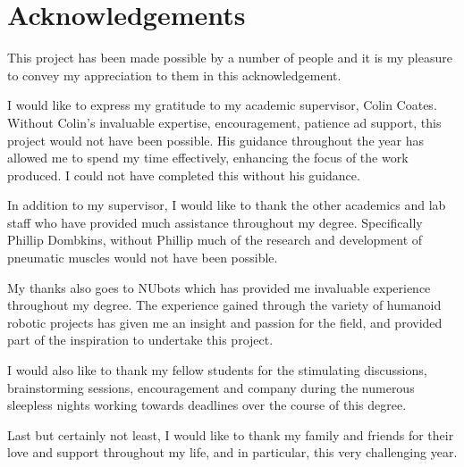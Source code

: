 \section*{Acknowledgements}
\raggedright\hfill\break

This project has been made possible by a number of people and it is my pleasure to convey my appreciation to them in this acknowledgement.\newline

I would like to express my gratitude to my academic supervisor, Colin Coates. Without Colin's invaluable expertise, encouragement, patience ad support, this project would not have been possible. His guidance throughout the year has allowed me to spend my time effectively, enhancing the focus of the work produced. I could not have completed this without his guidance.\newline

In addition to my supervisor, I would like to thank the other academics and lab staff who have provided much assistance throughout my degree. Specifically Phillip Dombkins, without Phillip much of the research and development of pneumatic muscles would not have been possible.\newline

My thanks also goes to NUbots which has provided me invaluable experience
throughout my degree. The experience gained through the variety of humanoid robotic projects has given me an insight and passion for the field, and provided part of the inspiration to undertake this project.\newline

I would also like to thank my fellow students for the stimulating discussions, brainstorming
sessions, encouragement and company during the numerous sleepless nights working towards
deadlines over the course of this degree.\newline

Last but certainly not least, I would like to thank my family and friends for their love and
support throughout my life, and in particular, this very challenging year.